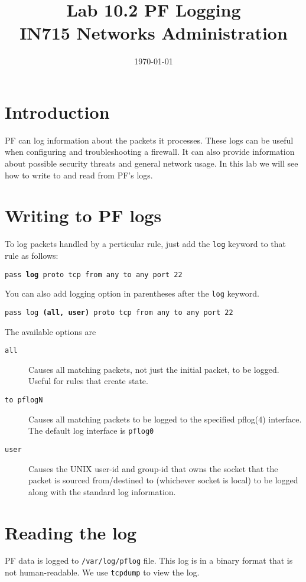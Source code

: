 \documentclass{article}
\begin{document}
\title{ Lab 10.2 PF Logging\\ IN715 Networks Administration}
\date{\today}
\maketitle

\section*{Introduction}
PF can log information about the packets it processes.  These logs can be useful when configuring and troubleshooting 
a firewall.  It can also provide information about possible security threats and general network usage.  In this lab
we will see how to write to and read from PF's logs.

\section{Writing to PF logs}
To log packets handled by a perticular rule, just add the \texttt{log} keyword to that rule as follows:

\texttt{pass \textbf{log} proto tcp from any to any port 22}

You can also add logging option in parentheses after the \texttt{log} keyword.

\texttt{pass log \textbf{(all, user)} proto tcp from any to any port 22}

The available options are

\begin{description}
	\item[\texttt{all}] Causes all matching packets, not just the initial packet, to be logged. Useful for rules that create state.
	\item[\texttt{to pflogN}] Causes all matching packets to be logged to the specified pflog(4) interface. The default log interface is \texttt{pflog0}
	\item[\texttt{user}] Causes the UNIX user-id and group-id that owns the socket that the packet is sourced from/destined to (whichever socket is local) to be logged along with the standard log information.
\end{description}

\section{Reading the log}
PF data is logged to \texttt{/var/log/pflog} file.  This log is in a binary format that is not human-readable.  We use \texttt{tcpdump} to view the log.
\end{document}
